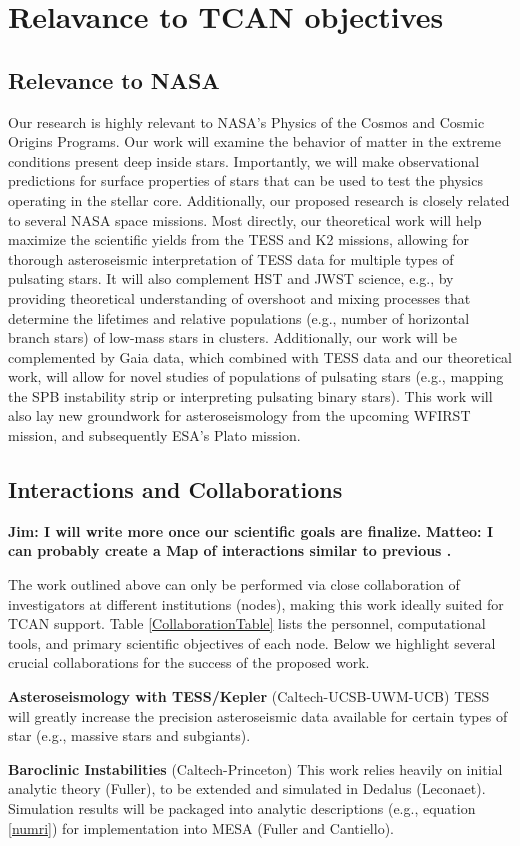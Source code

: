 {\color{orange}
\section{Relavance to TCAN objectives}
}

{\color{orange}
\subsection{Relevance to NASA}
}

Our research is highly relevant to NASA's Physics of the Cosmos and Cosmic Origins Programs. Our work will examine the behavior of matter in the extreme conditions present deep inside stars. Importantly, we will make observational predictions for surface properties of stars that can be used to test the physics operating in the stellar core. Additionally, our proposed research is closely related to several NASA space missions. Most directly, our theoretical work will help maximize the scientific yields from the TESS and K2 missions, allowing for thorough asteroseismic interpretation of TESS data for multiple types of pulsating stars. It will also complement HST and JWST science, e.g., by providing theoretical understanding of overshoot and mixing processes that determine the lifetimes and relative populations (e.g., number of horizontal branch stars) of low-mass stars in clusters. Additionally, our work will be complemented by Gaia data, which combined with TESS data and our theoretical work, will allow for novel studies of populations of pulsating stars (e.g., mapping the SPB instability strip or interpreting pulsating binary stars). This work will also lay new groundwork for asteroseismology from the upcoming WFIRST mission, and subsequently ESA's Plato mission. 

{\color{orange}
\subsection{Interactions and Collaborations}
}

{\bf Jim: I will write more once our scientific goals are finalize.}
{\bf Matteo: I can probably create a Map of interactions similar to previous .}

The work outlined above can only be performed via close collaboration of investigators at different institutions (nodes), making this work ideally suited for TCAN support. Table \ref{CollaborationTable} lists the personnel, computational tools, and primary scientific objectives of each node. Below we highlight several crucial collaborations for the success of the proposed work.

{\bf Asteroseismology with TESS/Kepler} (Caltech-UCSB-UWM-UCB) TESS will greatly increase the precision asteroseismic data available for certain types of star (e.g., massive stars and subgiants). 

{\bf Baroclinic Instabilities} (Caltech-Princeton) This work relies heavily on initial analytic theory (Fuller), to be extended and simulated in Dedalus (Leconaet). Simulation results will be packaged into analytic descriptions (e.g., equation \ref{numri}) for implementation into MESA (Fuller and Cantiello).

